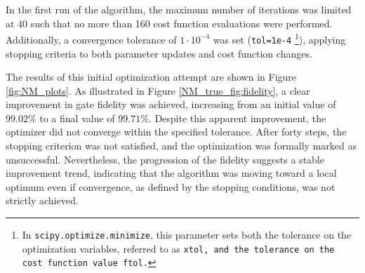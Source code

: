 In the first run of the algorithm, the maximum number of iterations was limited at 40 such that no more than 160 cost function evaluations were performed.
Additionally, a convergence tolerance of $1\cdot10^{-4}$ was set (\texttt{tol=1e-4} \footnote{In \texttt{scipy.optimize.minimize}, this parameter sets both the tolerance on the optimization variables, referred to as \tt{xtol}, and the tolerance on the cost function value \tt{ftol}.}), applying stopping criteria to both parameter updates and cost function changes.

The results of this initial optimization attempt are shown in Figure \ref{fig:NM_plots}. As illustrated in Figure \ref{NM_true_fig:fidelity}, a clear improvement in gate fidelity was achieved, increasing from an initial value of $99.02\%$ to a final value of $99.71\%$.
Despite this apparent improvement, the optimizer did not converge within the specified tolerance. After forty steps, the stopping criterion was not satisfied, and the optimization was formally marked as unsuccessful. 
Nevertheless, the progression of the fidelity suggests a stable improvement trend, indicating that the algorithm was moving toward a local optimum even if convergence, as defined by the stopping conditions, was not strictly achieved.

